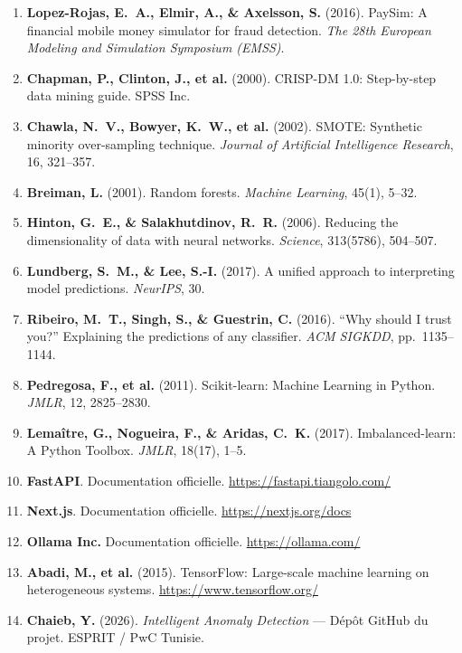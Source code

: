 \documentclass[12pt,a4paper,twoside]{report}
\begin{document}
\begin{enumerate}

  \item \textbf{Lopez-Rojas, E.~A., Elmir, A., \& Axelsson, S.} (2016). PaySim: A financial mobile money simulator for fraud detection. \textit{The 28th European Modeling and Simulation Symposium (EMSS)}.

  \item \textbf{Chapman, P., Clinton, J., et al.} (2000). CRISP-DM 1.0: Step-by-step data mining guide. SPSS Inc.

  \item \textbf{Chawla, N.~V., Bowyer, K.~W., et al.} (2002). SMOTE: Synthetic minority over-sampling technique. \textit{Journal of Artificial Intelligence Research}, 16, 321--357.

  \item \textbf{Breiman, L.} (2001). Random forests. \textit{Machine Learning}, 45(1), 5--32.

  \item \textbf{Hinton, G.~E., \& Salakhutdinov, R.~R.} (2006). Reducing the dimensionality of data with neural networks. \textit{Science}, 313(5786), 504--507.

  \item \textbf{Lundberg, S.~M., \& Lee, S.-I.} (2017). A unified approach to interpreting model predictions. \textit{NeurIPS}, 30.

  \item \textbf{Ribeiro, M.~T., Singh, S., \& Guestrin, C.} (2016). ``Why should I trust you?'' Explaining the predictions of any classifier. \textit{ACM SIGKDD}, pp.~1135--1144.

  \item \textbf{Pedregosa, F., et al.} (2011). Scikit-learn: Machine Learning in Python. \textit{JMLR}, 12, 2825--2830.

  \item \textbf{Lemaître, G., Nogueira, F., \& Aridas, C.~K.} (2017). Imbalanced-learn: A Python Toolbox. \textit{JMLR}, 18(17), 1--5.

  \item \textbf{FastAPI}. Documentation officielle. \url{https://fastapi.tiangolo.com/}

  \item \textbf{Next.js}. Documentation officielle. \url{https://nextjs.org/docs}

  \item \textbf{Ollama Inc.} Documentation officielle. \url{https://ollama.com/}

  \item \textbf{Abadi, M., et al.} (2015). TensorFlow: Large-scale machine learning on heterogeneous systems. \url{https://www.tensorflow.org/}

  \item \textbf{Chaieb, Y.} (2026). \textit{Intelligent Anomaly Detection} --- Dépôt GitHub du projet. ESPRIT / PwC Tunisie.

\end{enumerate}
\end{document}
